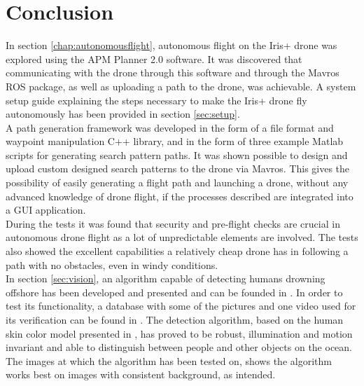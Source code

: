 \chapter{Conclusion}
In section \ref{chap:autonomousflight}, autonomous flight on the Iris+ drone was explored using the APM Planner 2.0 software.
It was discovered that communicating with the drone through this software and through the Mavros ROS package,
as well as uploading a path to the drone, was achievable.
A system setup guide explaining the steps necessary to make the Iris+ drone fly autonomously has been provided in section \ref{sec:setup}.
\\
A path generation framework was developed in the form of a file format and waypoint manipulation C++ library,
and in the form of three example Matlab scripts for generating search pattern paths.
It was shown possible to design and upload custom designed search patterns to the drone via Mavros.
This gives the possibility of easily generating a flight path and launching a drone, without any advanced knowledge of drone flight,
if the processes described are integrated into a GUI application.\\

During the tests it was found that security and pre-flight checks are crucial in autonomous drone flight
as a lot of unpredictable elements are involved.
The tests also showed the excellent capabilities a relatively cheap drone has in following a path with no obstacles, even in windy conditions.\\

In section \ref{sec:vision}, an algorithm capable of detecting humans drowning offshore has been developed and presented and can be founded in \cite{Ref:Github1} .
In order to test its functionality, a database with some of the pictures and one video used for its verification can be found in \cite{Ref:Github}.
The detection algorithm, based on the human skin color model presented in \cite{Ref:SkinDetection}, has proved to be robust, illumination and motion invariant and able to distinguish between people and other objects on the ocean. 
The images at which the algorithm has been tested on, shows the algorithm works best on images with consistent background, as intended.
\newpage